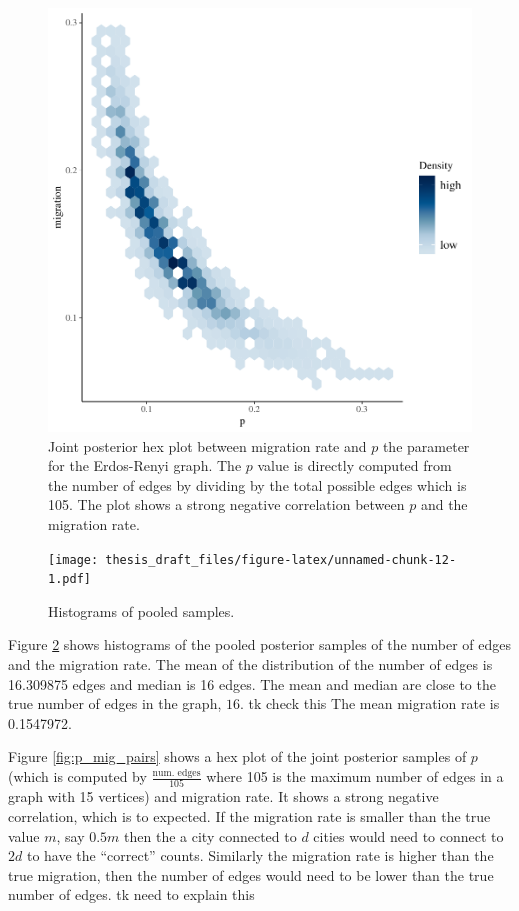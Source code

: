 \documentclass[11pt,a4paper]{article}
\numberwithin{equation}{section}
\begin{document}
\begin{figure}

{\centering \includegraphics[width=0.65\linewidth]{thesis_draft_files/figure-latex/unnamed-chunk-11-1} 

}

\caption{\label{fig:p_mig_pairs} Joint posterior hex plot between migration rate and $p$ the parameter for the Erdos-Renyi graph. The $p$ value is directly computed from the number of edges by dividing by the total possible edges which is 105. The plot shows a strong negative correlation between $p$ and the migration rate.}\label{fig:unnamed-chunk-11}
\end{figure}

\begin{figure}
\centering
\texttt{[image: thesis\_draft\_files/figure-latex/unnamed-chunk-12-1.pdf]}
\caption{\label{fig:pooled} Histograms of pooled samples.}
\end{figure}

Figure \ref{fig:pooled} shows histograms of the pooled posterior samples
of the number of edges and the migration rate. The mean of the
distribution of the number of edges is 16.309875 edges and median is 16
edges. The mean and median are close to the true number of edges in the
graph, \(16\). tk check this The mean migration rate is 0.1547972.

Figure \ref{fig:p_mig_pairs} shows a hex plot of the joint posterior
samples of \(p\) (which is computed by \(\frac{\text{num. edges}}{105}\)
where 105 is the maximum number of edges in a graph with 15 vertices)
and migration rate. It shows a strong negative correlation, which is to
expected. If the migration rate is smaller than the true value \(m\),
say \(0.5m\) then the a city connected to \(d\) cities would need to
connect to \(2d\) to have the ``correct'' counts. Similarly the
migration rate is higher than the true migration, then the number of
edges would need to be lower than the true number of edges. tk need to
explain this
\end{document}
